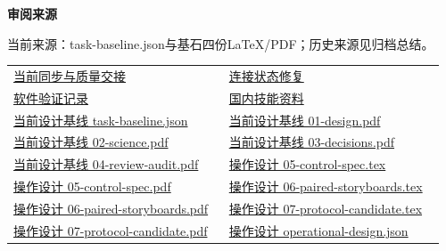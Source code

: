 \documentclass[11pt,a4paper]{article}
\newcommand{\reviewsubsection}[1]{\par\Needspace{4\baselineskip}\vspace{4pt}\begin{center}{\titlelatin\titlecjk\bfseries\fontsize{12}{18}\selectfont #1}\end{center}}
\begin{document}
\begin{minipage}{\linewidth}
\reviewsubsection{3.4 审阅来源}
当前来源：task-\allowbreak{}baseline.json与基石四份LaTeX/\allowbreak{}PDF；历史来源见归档总结。


\begingroup\small\setlength{\tabcolsep}{4pt}\begin{tabular}{@{}p{0.48\linewidth}p{0.48\linewidth}@{}}
\href{file:///D:/Agent/srp/agent/tasks/S-01/outputs/current-quality.md}{当前同步与质量交接} & \href{file:///D:/Agent/srp/agent/modules/acquisition/device_manager.py}{连接状态修复}\\[4pt]
\href{file:///D:/Agent/srp/agent/tasks/S-01/evidence/verification.json}{软件验证记录} & \href{file:///D:/Agent/srp/agent/governance/planning/2026-08-05_SRP_IJHCI_\%E5\%85\%A8\%E9\%A1\%B9\%E7\%9B\%AE1-12\%E6\%AD\%A5\%E8\%A7\%84\%E5\%88\%92\%E8\%AE\%BE\%E8\%AE\%A1\%E5\%8C\%85_v1.0/24_\%E5\%9B\%A2\%E9\%98\%9F\%E4\%BB\%BB\%E5\%8A\%A1\%E4\%B8\%8E\%E9\%A1\%B9\%E7\%9B\%AE\%E6\%B2\%BB\%E7\%90\%86/08_\%E4\%BB\%BB\%E5\%8A\%A1\%E6\%8A\%80\%E8\%83\%BD\%E4\%B8\%8E\%E5\%9B\%BD\%E5\%86\%85\%E5\%AD\%A6\%E4\%B9\%A0\%E8\%B5\%84\%E6\%96\%99_v1.0.md}{国内技能资料}\\[4pt]
\href{file:///D:/Agent/srp/agent/design/design-foundation-20261008/task-baseline.json}{当前设计基线 task-\allowbreak{}baseline.json} & \href{file:///D:/Agent/srp/agent/design/design-foundation-20261008/01-design.pdf}{当前设计基线 01-\allowbreak{}design.pdf}\\[4pt]
\href{file:///D:/Agent/srp/agent/design/design-foundation-20261008/02-science.pdf}{当前设计基线 02-\allowbreak{}science.pdf} & \href{file:///D:/Agent/srp/agent/design/design-foundation-20261008/03-decisions.pdf}{当前设计基线 03-\allowbreak{}decisions.pdf}\\[4pt]
\href{file:///D:/Agent/srp/agent/design/design-foundation-20261008/04-review-audit.pdf}{当前设计基线 04-\allowbreak{}review-\allowbreak{}audit.pdf} & \href{file:///D:/Agent/srp/agent/design/design-foundation-20261008/05-control-spec.tex}{操作设计 05-\allowbreak{}control-\allowbreak{}spec.tex}\\[4pt]
\href{file:///D:/Agent/srp/agent/design/design-foundation-20261008/05-control-spec.pdf}{操作设计 05-\allowbreak{}control-\allowbreak{}spec.pdf} & \href{file:///D:/Agent/srp/agent/design/design-foundation-20261008/06-paired-storyboards.tex}{操作设计 06-\allowbreak{}paired-\allowbreak{}storyboards.tex}\\[4pt]
\href{file:///D:/Agent/srp/agent/design/design-foundation-20261008/06-paired-storyboards.pdf}{操作设计 06-\allowbreak{}paired-\allowbreak{}storyboards.pdf} & \href{file:///D:/Agent/srp/agent/design/design-foundation-20261008/07-protocol-candidate.tex}{操作设计 07-\allowbreak{}protocol-\allowbreak{}candidate.tex}\\[4pt]
\href{file:///D:/Agent/srp/agent/design/design-foundation-20261008/07-protocol-candidate.pdf}{操作设计 07-\allowbreak{}protocol-\allowbreak{}candidate.pdf} & \href{file:///D:/Agent/srp/agent/design/design-foundation-20261008/operational-design.json}{操作设计 operational-\allowbreak{}design.json}\\[4pt]
\end{tabular}\endgroup\end{minipage}\par
\end{document}
